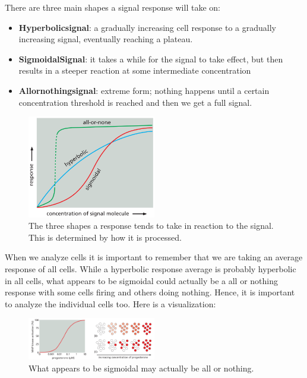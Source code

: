 \documentclass[../main.tex]{subfiles}
\begin{document}
There are three main shapes a signal response will take on: 
\begin{itemize}
	\item \textbf{\gls{Hyperbolicsignal}}: a gradually increasing cell response to a gradually increasing signal, eventually reaching a plateau.
	\item \textbf{\gls{SigmoidalSignal}}: it takes a while for the signal to take effect, but then results in a steeper reaction at some intermediate concentration
	\item \textbf{\gls{Allornothingsignal}}: extreme form; nothing happens until a certain concentration threshold is reached and then we get a full signal.
\end{itemize}
\begin{figure}[H]
	\centering
	\includegraphics[width=0.5\textwidth]{resp_types}
	\caption{The three shapes a response tends to take in reaction to the signal. This is determined by how it is processed.}
\end{figure} 

When we analyze cells it is important to remember that we are taking an average response of all cells. While a hyperbolic response average is probably hyperbolic in all cells, what appears to be sigmoidal could actually be a all or nothing response with some cells firing and others doing nothing. Hence, it is important to analyze the individual cells too. Here is a visualization:
\begin{figure}[H]
	\centering
	\includegraphics[width=0.5\textwidth]{resp_trick}
	\caption{What appears to be sigmoidal may actually be all or nothing.}
\end{figure} 
\end{document}
